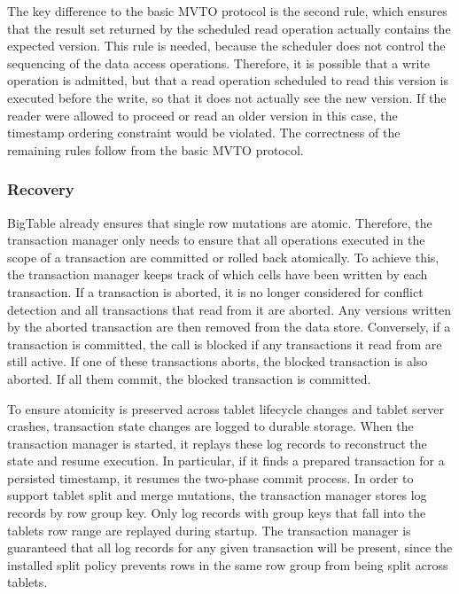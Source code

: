 \documentclass[10pt,final,journal]{IEEEtran}
\begin{document}
The key difference to the basic MVTO protocol is the second rule, which ensures that the result set returned by the scheduled read operation actually contains the expected version. This rule is needed, because the scheduler does not control the sequencing of the data access operations. Therefore, it is possible that a write operation is admitted, but that a read operation scheduled to read this version is executed before the write, so that it does not actually see the new version. If the reader were allowed to proceed or read an older version in this case, the timestamp ordering constraint would be violated. The correctness of the remaining rules follow from the basic MVTO protocol.

\subsubsection{Recovery}
BigTable already ensures that single row mutations are atomic. Therefore, the transaction manager only needs to ensure that all operations executed in the scope of a transaction are committed or rolled back atomically. To achieve this, the transaction manager keeps track of which cells have been written by each transaction. If a transaction is aborted, it is no longer considered for conflict detection and all transactions that read from it are aborted. Any versions written by the aborted transaction are then removed from the data store. Conversely, if a transaction is committed, the call is blocked if any transactions it read from are still active. If one of these transactions aborts, the blocked transaction is also aborted. If all them commit, the blocked transaction is committed.

To ensure atomicity is preserved across tablet lifecycle changes and tablet server crashes, transaction state changes are logged to durable storage. When the transaction manager is started, it replays these log records to reconstruct the state and resume execution. In particular, if it finds a prepared transaction for a persisted timestamp, it resumes the two-phase commit process. In order to support tablet split and merge mutations, the transaction manager stores log records by row group key. Only log records with group keys that fall into the tablets row range are replayed during startup. The transaction manager is guaranteed that all log records for any given transaction will be present, since the installed split policy prevents rows in the same row group from being split across tablets.
\end{document}
